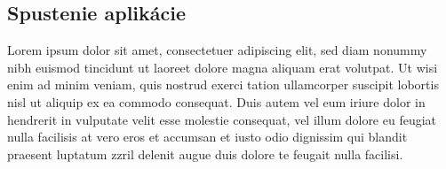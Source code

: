 \subsection{Spustenie aplikácie}
Lorem ipsum dolor sit amet, consectetuer adipiscing elit, sed diam nonummy nibh euismod tincidunt ut laoreet dolore magna aliquam erat volutpat. Ut wisi enim ad minim veniam, quis nostrud exerci tation ullamcorper suscipit lobortis nisl ut aliquip ex ea commodo consequat. Duis autem vel eum iriure dolor in hendrerit in vulputate velit esse molestie consequat, vel illum dolore eu feugiat nulla facilisis at vero eros et accumsan et iusto odio dignissim qui blandit praesent luptatum zzril delenit augue duis dolore te feugait nulla facilisi.
